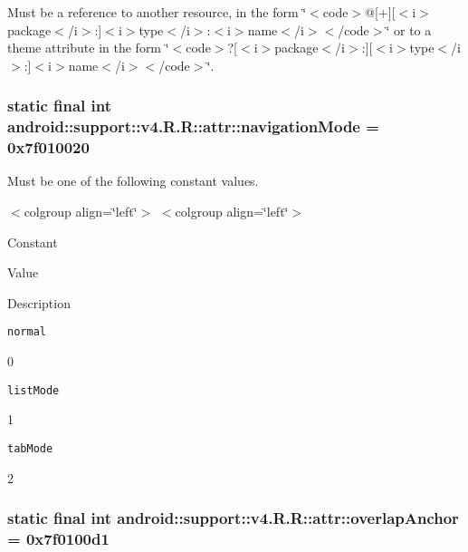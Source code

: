 Must be a reference to another resource, in the form \char`\"{}$<$code$>$@\mbox{[}+\mbox{]}\mbox{[}$<$i$>$package$<$/i$>$:\mbox{]}$<$i$>$type$<$/i$>$:$<$i$>$name$<$/i$>$$<$/code$>$\char`\"{} or to a theme attribute in the form \char`\"{}$<$code$>$?\mbox{[}$<$i$>$package$<$/i$>$:\mbox{]}\mbox{[}$<$i$>$type$<$/i$>$:\mbox{]}$<$i$>$name$<$/i$>$$<$/code$>$\char`\"{}. \hypertarget{classandroid_1_1support_1_1v4_1_1_r_1_1attr_5324d7c14715ffde107a0fc8e01bc374}{
\subsubsection[{navigationMode}]{\setlength{\rightskip}{0pt plus 5cm}static final int android::support::v4.R.R::attr::navigationMode = 0x7f010020}}
\label{classandroid_1_1support_1_1v4_1_1_r_1_1attr_5324d7c14715ffde107a0fc8e01bc374}


Must be one of the following constant values. \begin{TabularC}{0}
\hline
\end{TabularC}
$<$colgroup align=\char`\"{}left\char`\"{}$>$ $<$colgroup align=\char`\"{}left\char`\"{}$>$ 

Constant

Value

Description 

{\tt normal}

0

{\tt listMode}

1

{\tt tabMode}

2\hypertarget{classandroid_1_1support_1_1v4_1_1_r_1_1attr_c028b1b51295edd03abfb4ddc76db9f2}{
\subsubsection[{overlapAnchor}]{\setlength{\rightskip}{0pt plus 5cm}static final int android::support::v4.R.R::attr::overlapAnchor = 0x7f0100d1}}
\label{classandroid_1_1support_1_1v4_1_1_r_1_1attr_c028b1b51295edd03abfb4ddc76db9f2}


